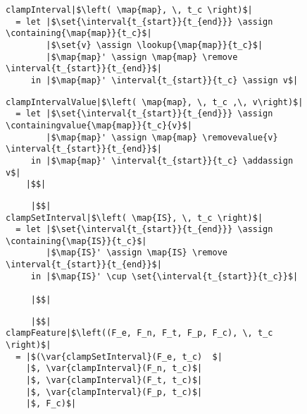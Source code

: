 \begin{figure}
\begin{minipage}[t]{0.5\textwidth}
  \begin{verbatim}
clampInterval|$\left( \map{map}, \, t_c \right)$|
  = let |$\set{\interval{t_{start}}{t_{end}}} \assign \containing{\map{map}}{t_c}$|
        |$\set{v} \assign \lookup{\map{map}}{t_c}$|
        |$\map{map}' \assign \map{map} \remove \interval{t_{start}}{t_{end}}$|
     in |$\map{map}' \interval{t_{start}}{t_c} \assign v$|
  \end{verbatim}
\end{minipage}
\begin{minipage}[t]{0.5\textwidth}
  \begin{verbatim}
clampIntervalValue|$\left( \map{map}, \, t_c ,\, v\right)$|
  = let |$\set{\interval{t_{start}}{t_{end}}} \assign \containingvalue{\map{map}}{t_c}{v}$|
        |$\map{map}' \assign \map{map} \removevalue{v} \interval{t_{start}}{t_{end}}$|
     in |$\map{map}' \interval{t_{start}}{t_c} \addassign v$|
    |$$|
  \end{verbatim}
\end{minipage}

\begin{minipage}[t]{0.5\textwidth}
  \begin{verbatim}
     |$$|
clampSetInterval|$\left( \map{IS}, \, t_c \right)$|
  = let |$\set{\interval{t_{start}}{t_{end}}} \assign \containing{\map{IS}}{t_c}$|
        |$\map{IS}' \assign \map{IS} \remove \interval{t_{start}}{t_{end}}$|
     in |$\map{IS}' \cup \set{\interval{t_{start}}{t_c}}$|

     |$$|
  \end{verbatim}
\end{minipage}
\begin{minipage}[t]{0.5\textwidth}
  \begin{verbatim}
     |$$|
clampFeature|$\left((F_e, F_n, F_t, F_p, F_c), \, t_c \right)$|
  = |$(\var{clampSetInterval}(F_e, t_c)  $|
    |$, \var{clampInterval}(F_n, t_c)$|
    |$, \var{clampInterval}(F_t, t_c)$|
    |$, \var{clampInterval}(F_p, t_c)$|
    |$, F_c)$|
  \end{verbatim}
\end{minipage}


\end{figure}
